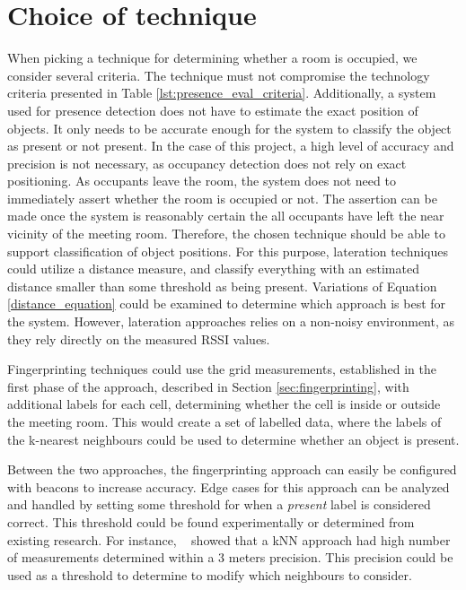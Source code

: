 \section{Choice of technique}
When picking a technique for determining whether a room is occupied, we consider several criteria.
The technique must not compromise the technology criteria presented in Table \ref{lst:presence_eval_criteria}.
Additionally, a system used for presence detection does not have to estimate the exact position of objects.
It only needs to be accurate enough for the system to classify the object as present or not present.
In the case of this project, a high level of accuracy and precision is not necessary, as occupancy detection does not rely on exact positioning.
As occupants leave the room, the system does not need to immediately assert whether the room is occupied or not.
The assertion can be made once the system is reasonably certain the all occupants have left the near vicinity of the meeting room.
Therefore, the chosen technique should be able to support classification of object positions.  
For this purpose, lateration techniques could utilize a distance measure, and classify everything with an estimated distance smaller than some threshold as being present.
Variations of Equation \ref{distance_equation} could be examined to determine which approach is best for the system.
However, lateration approaches relies on a non-noisy environment, as they rely directly on the measured RSSI values.

Fingerprinting techniques could use the grid measurements, established in the first phase of the approach, described in Section \ref{sec:fingerprinting}, with additional labels for each cell, determining whether the cell is inside or outside the meeting room.
This would create a set of labelled data, where the labels of the k-nearest neighbours could be used to determine whether an object is present. 

Between the two approaches, the fingerprinting approach can easily be configured with beacons to increase accuracy.
Edge cases for this approach can be analyzed and handled by setting some threshold for when a \textit{present} label is considered correct. 
This threshold could be found experimentally or determined from existing research. 
For instance, \citeauthor{ble_kneares_neural}~\cite{ble_kneares_neural} showed that a kNN approach had high number of measurements determined within a 3 meters precision. 
This precision could be used as a threshold to determine to modify which neighbours to consider.    
